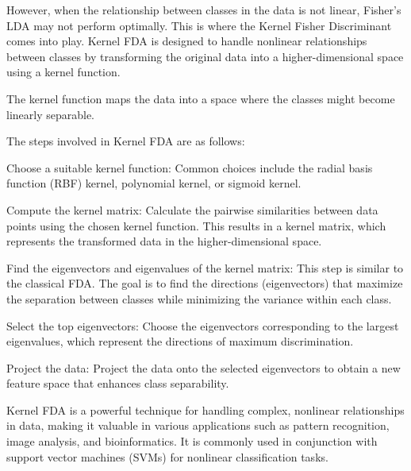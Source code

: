 However, when the relationship between classes in the data is not linear, Fisher's LDA may not perform optimally. 
This is where the Kernel Fisher Discriminant comes into play. Kernel FDA is designed to handle nonlinear relationships 
between classes by transforming the original data into a higher-dimensional space using a kernel function. 

The kernel function maps the data into a space where the classes might become linearly separable.

The steps involved in Kernel FDA are as follows:

Choose a suitable kernel function: Common choices include the radial basis function (RBF) kernel, polynomial kernel, 
or sigmoid kernel.

Compute the kernel matrix: Calculate the pairwise similarities between data points using the chosen kernel function. 
This results in a kernel matrix, which represents the transformed data in the higher-dimensional space.

Find the eigenvectors and eigenvalues of the kernel matrix: This step is similar to the classical FDA. The goal is to find the directions (eigenvectors) that maximize the separation between classes while minimizing 
the variance within each class.

Select the top eigenvectors: Choose the eigenvectors corresponding to the largest eigenvalues, 
which represent the directions of maximum discrimination.

Project the data: Project the data onto the selected eigenvectors to obtain a new feature space that enhances class separability.

Kernel FDA is a powerful technique for handling complex, nonlinear relationships in data, making it valuable in various 
applications such as pattern recognition, image analysis, and bioinformatics. It is commonly used in conjunction with support 
vector machines (SVMs) for nonlinear classification tasks.




